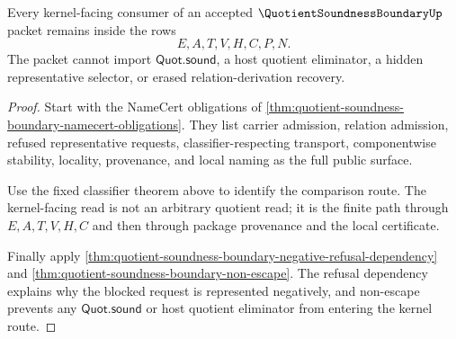 \begin{theorem}
\label{thm:quotient-soundness-boundary-kernel-nonescape}
Every kernel-facing consumer of an accepted $\QuotientSoundnessBoundaryUp$ packet remains inside the rows
$$
E,A,T,V,H,C,P,N.
$$
The packet cannot import $\mathsf{Quot.sound}$, a host quotient eliminator, a hidden representative selector, or erased relation-derivation recovery.
\end{theorem}
\begin{proof}
Start with the NameCert obligations of \autoref{thm:quotient-soundness-boundary-namecert-obligations}. They list carrier admission, relation admission, refused representative requests, classifier-respecting transport, componentwise stability, locality, provenance, and local naming as the full public surface.

Use the fixed classifier theorem above to identify the comparison route. The kernel-facing read is not an arbitrary quotient read; it is the finite path through $E,A,T,V,H,C$ and then through package provenance and the local certificate.

Finally apply \autoref{thm:quotient-soundness-boundary-negative-refusal-dependency} and \autoref{thm:quotient-soundness-boundary-non-escape}. The refusal dependency explains why the blocked request is represented negatively, and non-escape prevents any $\mathsf{Quot.sound}$ or host quotient eliminator from entering the kernel route.
\end{proof}

